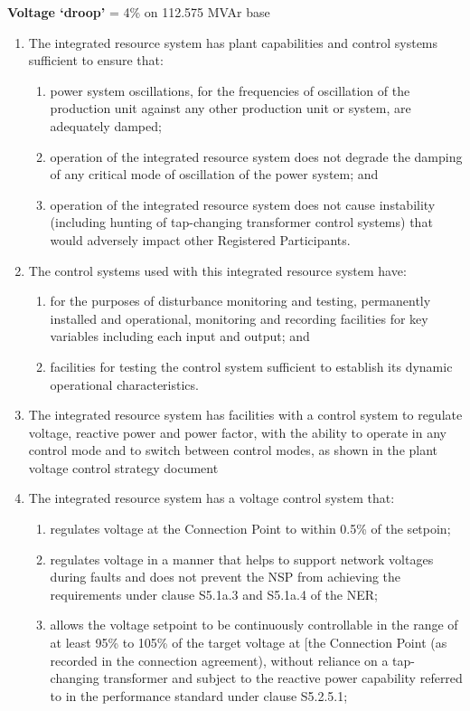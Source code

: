  \textbf{Voltage ‘droop’} = 4\% on 112.575 MVAr base

\begin{enumerate}
	\item The integrated resource system has plant capabilities and control systems sufficient to ensure that:
	\begin{enumerate}
		\item power system oscillations, for the frequencies of oscillation of the production unit against any other production unit or system, are adequately damped;
		\item operation of the integrated resource system does not degrade the damping of any critical mode of oscillation of the power system; and
		\item operation of the integrated resource system does not cause instability (including hunting of tap-changing transformer control systems) that would adversely impact other Registered Participants.
	\end{enumerate}
	\item The control systems used with this integrated resource system have:
	\begin{enumerate}
		\item for the purposes of disturbance monitoring and testing, permanently installed and operational, monitoring and recording facilities for key variables including each input and output; and
		\item facilities for testing the control system sufficient to establish its dynamic operational characteristics.
	\end{enumerate}
	\item The integrated resource system has facilities with a control system to regulate voltage, reactive power and power factor, with the ability to operate in any control mode and to switch between control modes, as shown in the plant voltage control strategy document
	\item The integrated resource system has a voltage control system that:
	\begin{enumerate}
		\item regulates voltage at the Connection Point to within 0.5\% of the setpoin;
		\item regulates voltage in a manner that helps to support network voltages during faults and does not prevent the NSP from achieving the requirements under clause S5.1a.3 and S5.1a.4 of the NER;
		\item allows the voltage setpoint to be continuously controllable in the range of at least 95\% to 105\% of the target voltage at [the Connection Point (as recorded in the connection agreement), without reliance on a tap-changing transformer and subject to the reactive power capability referred to in the performance standard under clause S5.2.5.1;

\end{enumerate}
\end{enumerate}
